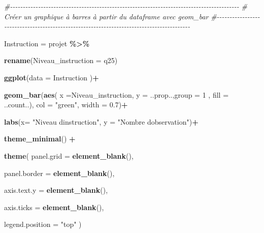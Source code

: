 \documentclass[
]{article}
\newenvironment{Shaded}{\begin{snugshade}}{\end{snugshade}}
\newcommand{\AttributeTok}[1]{\textcolor[rgb]{0.13,0.29,0.53}{#1}}
\newcommand{\CommentTok}[1]{\textcolor[rgb]{0.56,0.35,0.01}{\textit{#1}}}
\newcommand{\DecValTok}[1]{\textcolor[rgb]{0.00,0.00,0.81}{#1}}
\newcommand{\FloatTok}[1]{\textcolor[rgb]{0.00,0.00,0.81}{#1}}
\newcommand{\FunctionTok}[1]{\textcolor[rgb]{0.13,0.29,0.53}{\textbf{#1}}}
\newcommand{\NormalTok}[1]{#1}
\newcommand{\OtherTok}[1]{\textcolor[rgb]{0.56,0.35,0.01}{#1}}
\newcommand{\SpecialCharTok}[1]{\textcolor[rgb]{0.81,0.36,0.00}{\textbf{#1}}}
\newcommand{\StringTok}[1]{\textcolor[rgb]{0.31,0.60,0.02}{#1}}
\begin{document}
\newpage

\begin{Shaded}
\begin{Highlighting}[]
\CommentTok{\#{-}{-}{-}{-}{-}{-}{-}{-}{-}{-}{-}{-}{-}{-}{-}{-}{-}{-}{-}{-}{-}{-}{-}{-}{-}{-}{-}{-}{-}{-}{-}{-}{-}{-}{-}{-}{-}{-}{-}{-}{-}{-}{-}{-}{-}{-}{-}{-}{-}{-}{-}{-}{-}{-}{-}{-}{-}{-}{-}{-}{-}{-}{-}{-}{-}{-}{-}{-}{-}{-}{-}{-}{-}{-}{-}{-}{-}{-}{-}{-}{-}{-}{-}{-}{-}{-}{-}{-}{-}{-}}
\CommentTok{\#  Créer un graphique à barres à partir du dataframe avec geom\_bar}
\CommentTok{\#{-}{-}{-}{-}{-}{-}{-}{-}{-}{-}{-}{-}{-}{-}{-}{-}{-}{-}{-}{-}{-}{-}{-}{-}{-}{-}{-}{-}{-}{-}{-}{-}{-}{-}{-}{-}{-}{-}{-}{-}{-}{-}{-}{-}{-}{-}{-}{-}{-}{-}{-}{-}{-}{-}{-}{-}{-}{-}{-}{-}{-}{-}{-}{-}{-}{-}{-}{-}{-}{-}{-}{-}{-}{-}{-}{-}{-}{-}{-}{-}{-}{-}{-}{-}{-}{-}{-}{-}{-}{-}}


\NormalTok{Instruction }\OtherTok{=}\NormalTok{ projet }\SpecialCharTok{\%\textgreater{}\%}
  
  \FunctionTok{rename}\NormalTok{(}\AttributeTok{Niveau\_instruction =}\NormalTok{ q25)}


\FunctionTok{ggplot}\NormalTok{(}\AttributeTok{data =}\NormalTok{ Instruction )}\SpecialCharTok{+}
  
  \FunctionTok{geom\_bar}\NormalTok{(}\FunctionTok{aes}\NormalTok{( }\AttributeTok{x =}\NormalTok{Niveau\_instruction,}
                \AttributeTok{y =}\NormalTok{ ..prop..,}\AttributeTok{group =} \DecValTok{1}\NormalTok{ , }
                \AttributeTok{fill =}\NormalTok{ ..count..), }
           \AttributeTok{col =} \StringTok{"green"}\NormalTok{, }\AttributeTok{width =} \FloatTok{0.7}\NormalTok{)}\SpecialCharTok{+}
  
  \FunctionTok{labs}\NormalTok{(}\AttributeTok{x=} \StringTok{"Niveau d\textquotesingle{}instruction"}\NormalTok{, }\AttributeTok{y =} \StringTok{"Nombre d\textquotesingle{}observation"}\NormalTok{)}\SpecialCharTok{+}
  
  \FunctionTok{theme\_minimal}\NormalTok{() }\SpecialCharTok{+}  
  
  \FunctionTok{theme}\NormalTok{(}
    \AttributeTok{panel.grid =} \FunctionTok{element\_blank}\NormalTok{(),}
    
    \AttributeTok{panel.border =} \FunctionTok{element\_blank}\NormalTok{(),}
    
    \AttributeTok{axis.text.y =} \FunctionTok{element\_blank}\NormalTok{(),}
    
    \AttributeTok{axis.ticks =} \FunctionTok{element\_blank}\NormalTok{(),}
    
    \AttributeTok{legend.position =} \StringTok{"top"}
\NormalTok{  )}
\end{Highlighting}
\end{Shaded}
\end{document}
